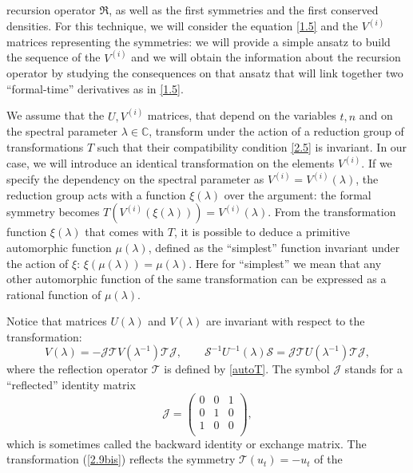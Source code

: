 \documentclass[fleqn,11pt,twoside]{article}
\newcommand\cS{{\mathcal S}}
\newcommand\cT{{\mathcal T}}
\theoremstyle{definition}
\begin{document}
recursion operator $\mathfrak{R}$, as well as the first symmetries and the first
conserved densities.
	For this technique, we will consider the equation \eqref{1.5} and the
$V^{(i)}$ matrices representing the symmetries: we will provide a simple ansatz
to build the sequence of the $V^{(i)}$ and we will obtain the information about
the recursion operator by studying the consequences on that ansatz that will
link together two ``formal-time'' derivatives as in \eqref{1.5}.\par
	We assume that the $U, V^{(i)}$ matrices, that depend on the variables
$t,n$ and on the spectral parameter $\lambda \in \mathbb{C}$, transform under
the action of a reduction group \cite{31} of transformations $T$ such that their
compatibility condition \eqref{2.5} is invariant. In our case, we will introduce
an identical transformation on the elements $V^{(i)}$.
	If we specify the dependency on the spectral parameter as $V^{(i)} =
V^{(i)}(\lambda)$, the reduction group acts with a function $\xi(\lambda)$ over
the argument: the formal symmetry becomes $T(V^{(i)}(\xi(\lambda))) =
V^{(i)}(\lambda)$.
	From the transformation function $\xi(\lambda)$ that comes with $T$, it
is possible to deduce a primitive automorphic function $\mu(\lambda)$, defined
as the ``simplest'' function invariant under the action of $\xi$:
$\xi(\mu(\lambda))=\mu(\lambda)$. Here for ``simplest'' we mean that any other
automorphic function of the same transformation can be expressed as a rational
function of $\mu(\lambda)$.\par
\fi
Notice that matrices $U(\lambda)$ and $V(\lambda)$ are invariant with respect to the
transformation:
	\begin{equation}
		 V(\lambda)=  - \mathcal{J} \mathcal{T} V(\lambda^{-1})
\mathcal{T} \mathcal{J},\qquad \cS^{-1} U^{-1}(\lambda)\cS=  \mathcal{J} \cT U(\lambda^{-1}) \cT  \mathcal{J},
		\label{2.9bis}
	\end{equation}
where the reflection operator $\mathcal{T}$ is defined by \eqref{autoT}.
	The symbol $\mathcal{J}$ stands for a ``reflected'' identity matrix
	\begin{equation*}
		\mathcal{J} = \begin{pmatrix}
			0 & 0 & 1\\
			0 & 1 & 0\\
			1 & 0 & 0\\
		\end{pmatrix},
		\label{2.8tris}
	\end{equation*}
which is sometimes called the backward identity or
exchange matrix. The transformation (\ref{2.9bis}) reflects the symmetry $\cT(u_t)=-u_t$ of the
\end{document}
